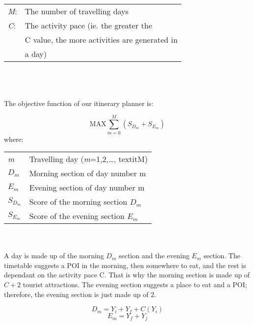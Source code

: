 \setlength{\tabcolsep}{20pt}

\begin{tabular}{l l}

\textit{M}:  &  The number of travelling days \\
\textit{C}: & The activity pace (ie. the greater the \\
 & C value, the more activities are generated in \\
 & a day) \\  
\end{tabular}
\\
\\
\\
The objective function of our itinerary planner is:

\[ \text{MAX}  \sum_{m=0}^{M} ( S_{{D_m}} + S_{{E_m}}) \]
where:
\\
\begin{tabular}{l l}
\textit{m} & Travelling day (\textit{m}=1,2,\ldots, textit{M}) \\ 
\textit{$D_m$} & Morning section of day number m \\  
\textit{$E_m$} & Evening section of day number m \\  
\textit{$S_{D_m}$} & Score of the morning section $D_m$ \\  
\textit{$S_{E_m}$} & Score of the evening section $E_m$ \\  
\end{tabular}
\\
\\

A day is made up of the morning ${D_m}$ section and
the evening ${E_m}$ section. The timetable suggests a
POI in the morning, then somewhere to eat, and the
rest is dependant on the activity pace C. That is why
the morning section is made up of $C + 2$ tourist
attractions. The evening section suggests a place to
eat and a POI; therefore, the evening section is just
made up of $2$. 


\[D_m = Y_i + Y_f + C ( Y_i) \]
\[E_m = Y_f + Y_j \]

